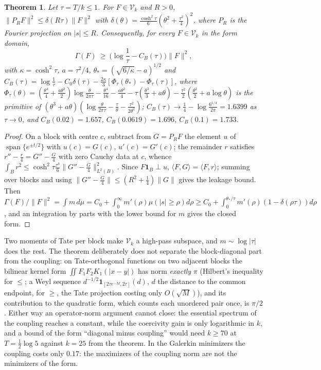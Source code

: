 \documentclass[11pt]{amsart}
\newtheorem{theorem}{Theorem}[section]
\theoremstyle{definition}
\theoremstyle{remark}
\begin{document}
\begin{theorem}\label{thm:B}
Let $\tau=T/k\le1$. For $F\in\mathcal V_k$ and $R>0$, $\|P_RF\|^2\le\delta(R\tau)\|F\|^2$ with
$\delta(\theta)=\frac{\cosh^2\tau}6(\theta^2+\frac{\tau^2}4)^2$, where $P_R$ is the Fourier projection on $|s|\le R$.
Consequently, for every $F\in\mathcal V_k$ in the form domain,
\[
\Gamma(F)\ \ge\ \Big(\log\frac1\tau-C_B(\tau)\Big)\|F\|^2,
\]
with $\kappa=\cosh^2\tau$, $a=\tau^2/4$, $\theta_*=(\sqrt{6/\kappa}-a)^{1/2}$ and
$C_B(\tau)=\log\frac1\tau-C_0\delta(\tau)-\frac{2\kappa}3[\Phi_\tau(\theta_*)-\Phi_\tau(\tau)]$, where
$\Phi_\tau(\theta)=(\frac{\theta^4}4+\frac{a\theta^2}2)\log\frac\theta{2\pi\tau}-\frac{\theta^4}{16}-\frac{a\theta^2}4-\tau(\frac{\theta^3}3+a\theta)-\frac{\tau^2}2(\frac{\theta^2}2+a\log\theta)$
is the primitive of $(\theta^3+a\theta)(\log\frac\theta{2\pi\tau}-\frac\tau\theta-\frac{\tau^2}{2\theta^2})$; $C_B(\tau)\to\frac14-\log\frac{6^{1/4}}{2\pi}=1.6399$ as $\tau\to0$, and
$C_B(0.02)=1.657$, $C_B(0.0619)=1.696$, $C_B(0.1)=1.733$.
\end{theorem}
\begin{proof}
On a block with centre $c$, subtract from $G=P_RF$ the element $u$ of $\operatorname{span}\{e^{\pm t/2}\}$ with $u(c)=G(c)$,
$u'(c)=G'(c)$; the remainder $r$ satisfies $r''-\frac r4=G''-\frac G4$ with zero Cauchy data at $c$, whence
$\int_Br^2\le\cosh^2\tau\frac{\tau^4}6\|G''-\frac G4\|^2_{L^2(B)}$. Since $F\mathbf 1_B\perp u$, $\langle F,G\rangle=\langle F,r\rangle$;
summing over blocks and using $\|G''-\frac G4\|\le(R^2+\frac14)\|G\|$ gives the leakage bound. Then
$\Gamma(F)/\|F\|^2=\int m\,d\mu=C_0+\int_0^\infty m'(\rho)\mu(|s|\ge\rho)d\rho\ge C_0+\int_0^{\theta_*/\tau}m'(\rho)(1-\delta(\rho\tau))d\rho$,
and an integration by parts with the lower bound for $m$ gives the closed form.
\end{proof}
Two moments of Tate per block make $\mathcal V_k$ a high-pass subspace, and $m\sim\log|\tau|$ does the rest. The theorem
deliberately does not separate the block-diagonal part from the coupling: on Tate-orthogonal functions on two adjacent
blocks the bilinear kernel form $\iint F_1F_2K_1(|x-y|)$ has norm \emph{exactly} $\pi$ (Hilbert's inequality for $\le$; a Weyl sequence
$d^{-1/2}\mathbf 1_{[2\tau e^{-M},2\tau]}(d)$, $d$ the distance to the common endpoint, for $\ge$, the Tate projection costing only
$O(\sqrt M)$), and its contribution to the quadratic form, which counts each unordered pair once, is $\pi/2$. Either way an
operator-norm argument cannot close: the essential spectrum of the coupling reaches a constant, while the coercivity gain is
only logarithmic in $k$, and a bound of the form ``diagonal minus coupling'' would need $k\ge70$ at $T=\frac12\log5$ against
$k=25$ from the theorem. In the Galerkin minimizers the coupling costs only $0.17$: the maximizers of the coupling norm are not
the minimizers of the form.
\end{document}
